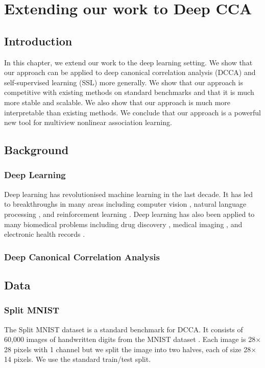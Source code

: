 \chapter{Extending our work to Deep CCA}
\minitoc
\section{Introduction}
In this chapter, we extend our work to the deep learning setting. We show that our approach can be applied to deep canonical correlation analysis (DCCA) and self-supervised learning (SSL) more generally. We show that our approach is competitive with existing methods on standard benchmarks and that it is much more stable and scalable. We also show that our approach is much more interpretable than existing methods. We conclude that our approach is a powerful new tool for multiview nonlinear association learning.

\section{Background}
\subsection{Deep Learning}
Deep learning has revolutionised machine learning in the last decade. It has led to breakthroughs in many areas including computer vision \cite{krizhevsky2012imagenet}, natural language processing \cite{devlin2018bert}, and reinforcement learning \cite{mnih2015human}. Deep learning has also been applied to many biomedical problems including drug discovery \cite{gawehn2016deep}, medical imaging \cite{litjens2017survey}, and electronic health records \cite{rajkomar2018scalable}.

\subsection{Deep Canonical Correlation Analysis}


\section{Data}

\subsection{Split MNIST}
The Split MNIST dataset \cite{wang2015stochastic} is a standard benchmark for DCCA. It consists of 60,000 images of handwritten digits from the MNIST dataset \cite{lecun1998gradient}. Each image is 28$\times$28 pixels with 1 channel but we split the image into two halves, each of size 28$\times$14 pixels. We use the standard train/test split.

